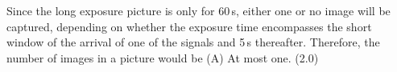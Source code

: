 \begin{description}
  Since the long exposure picture is only for 60\,s, either one or no image
  will be captured, depending on whether the exposure time encompasses the
  short window of the arrival of one of the signals and 5\,s thereafter.
  Therefore, the number of images in a picture would be (A) At most one.
  \hfill(2.0)
\end{description}
